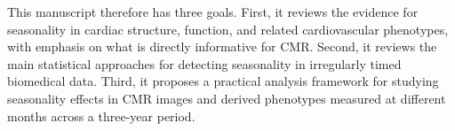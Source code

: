 This manuscript therefore has three goals. First, it reviews the evidence for seasonality in cardiac structure, function, and related cardiovascular phenotypes, with emphasis on what is directly informative for CMR. Second, it reviews the main statistical approaches for detecting seasonality in irregularly timed biomedical data. Third, it proposes a practical analysis framework for studying seasonality effects in CMR images and derived phenotypes measured at different months across a three-year period.
